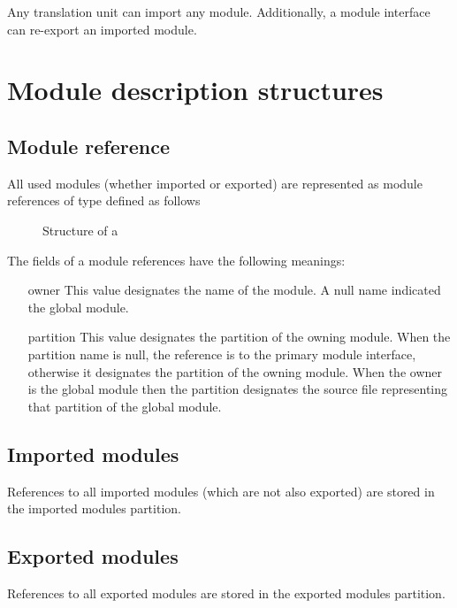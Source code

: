\label{sec:ifc-modules}

Any translation unit can import any module.  Additionally, a module interface can re-export an imported module.

\section{Module description structures}
\label{sec:ifc:module-structures}

\subsection{Module reference}
\label{sec:ifc--module-reference}

All used modules (whether imported or exported) are represented as module references of type defined as follows
%
\begin{figure}[h]
	\centering
	\caption{Structure of a }
	\label{fig:ifc-module-reference-structure}
\end{figure}
%

The fields of a module references have the following meanings:
\begin{itemize}
	\item[owner] This value designates the name of the module.  A null name indicated the global module.

	\item[partition] This value designates the partition of the owning module.  When the partition name is null, the reference is to
	the primary module interface, otherwise it designates the partition of the owning module.  When the owner is the global module
	then the partition designates the source file representing that partition of the global module.
\end{itemize}


\subsection{Imported modules}
\label{sec:ifc-imported-module}

References to all imported modules (which are not also exported) are stored in the imported modules partition.



\subsection{Exported modules}
\label{sec:ifc-exported-module}

References to all exported modules are stored in the exported modules partition.

